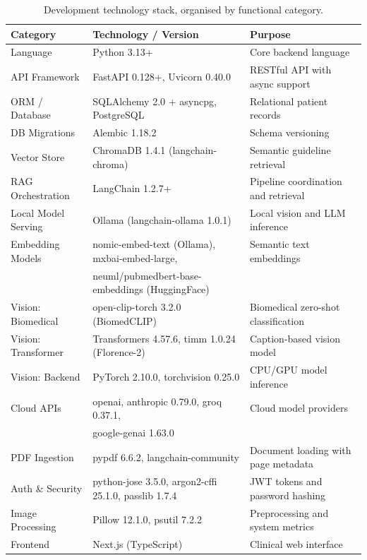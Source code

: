 \documentclass[12pt,a4paper]{report}
\begin{document}
	\begin{table}[H]
		\centering
		\caption{Development technology stack, organised by functional category.}
		\label{tab:stack}
		\small
		\renewcommand{\arraystretch}{1.25}
		\begin{tabularx}{\textwidth}{@{}l l X@{}}
			\toprule
			\textbf{Category} & \textbf{Technology / Version} & \textbf{Purpose} \\
			\midrule
			Language             & Python 3.13+                                         & Core backend language \\
			API Framework        & FastAPI 0.128+, Uvicorn 0.40.0                       & RESTful API with async support \\
			ORM / Database       & SQLAlchemy 2.0 + asyncpg, PostgreSQL                 & Relational patient records \\
			DB Migrations        & Alembic 1.18.2                                       & Schema versioning \\
			Vector Store         & ChromaDB 1.4.1 (langchain-chroma)                    & Semantic guideline retrieval \\
			RAG Orchestration    & LangChain 1.2.7+                                     & Pipeline coordination and retrieval \\
			Local Model Serving  & Ollama (langchain-ollama 1.0.1)                      & Local vision and LLM inference \\
			Embedding Models     & nomic-embed-text (Ollama), mxbai-embed-large,        & Semantic text embeddings \\
			& neuml/pubmedbert-base-embeddings (HuggingFace)       & \\
			Vision: Biomedical   & open-clip-torch 3.2.0 (BiomedCLIP)                  & Biomedical zero-shot classification \\
			Vision: Transformer  & Transformers 4.57.6, timm 1.0.24 (Florence-2)       & Caption-based vision model \\
			Vision: Backend      & PyTorch 2.10.0, torchvision 0.25.0                   & CPU/GPU model inference \\
			Cloud APIs           & openai, anthropic 0.79.0, groq 0.37.1,               & Cloud model providers \\
			& google-genai 1.63.0                                  & \\
			PDF Ingestion        & pypdf 6.6.2, langchain-community                     & Document loading with page metadata \\
			Auth \& Security     & python-jose 3.5.0, argon2-cffi 25.1.0, passlib 1.7.4 & JWT tokens and password hashing \\
			Image Processing     & Pillow 12.1.0, psutil 7.2.2                          & Preprocessing and system metrics \\
			Frontend             & Next.js (TypeScript)                                 & Clinical web interface \\
			\bottomrule
		\end{tabularx}
	\end{table}
	
\end{document}
